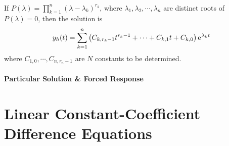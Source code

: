 \documentclass[10pt,UTF8]{article}
\newenvironment{definition box}
{\begin{tcolorbox}[colback=blue!5!white,colframe=blue!75!black,parbox=false,before upper=\par,before lower=\par]}
{\end{tcolorbox}}
\newenvironment{theorem box}
{\begin{tcolorbox}[colback=yellow!5!white,colframe=yellow!75!black,parbox=false,before upper=\par,before lower=\par]}
{\end{tcolorbox}}
\theoremstyle{definition}
\newtheorem{definition inner}{Definition}[section]
\theoremstyle{plain}
\newtheorem{theorem inner}{Theorem}[section]
\theoremstyle{definition}
\newtheorem*{proof inner}{\textit{Proof}}
\theoremstyle{remark}
\newcommand{\e}{\mathrm{e}{\mkern 1 mu}}
\begin{document}
\paragraph{}
If $\displaystyle P(\lambda)=\prod_{k=1}^{n}(\lambda-\lambda_k)^{r_k}$,
where $\lambda_1,\lambda_2,\cdots,\lambda_n$ are distinct roots of $P(\lambda)=0$,
then the solution is
\begin{equation*}
    y_h(t) = \sum_{k=1}^n \left(
        C_{k,r_k-1}t^{r_k-1} + \cdots + C_{k,1}t + C_{k,0}
    \right) \e^{\lambda_k t}
\end{equation*}
where $C_{1,0},\cdots,C_{n,r_n-1}$ are $N$ constants to be determined.

\subsection{Particular Solution \& Forced Response}




\part{Linear Constant-Coefficient Difference Equations}
\end{document}
